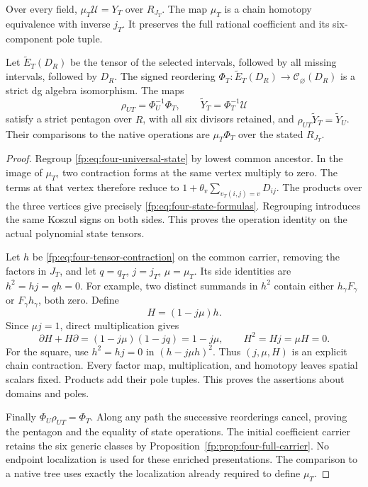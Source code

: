 \begin{theorem}
\label{fp:thm:four-common-state}
Over every field, \(\mu_T\mathcal U=Y_T\) over \(R_{J_T}\).
The map \(\mu_T\) is a chain homotopy equivalence with inverse
\(j_T\).  It preserves the full rational coefficient and its
six-component pole tuple.

Let \(\widetilde E_T(D_R)\) be the tensor of the selected
intervals, followed by all missing intervals, followed by \(D_R\).
The signed reordering
\(\Phi_T:\widetilde E_T(D_R)\to\mathcal C_\varnothing(D_R)\)
is a strict dg algebra isomorphism.  The maps
\[
 \rho_{UT}=\Phi_U^{-1}\Phi_T,\qquad
 \widetilde Y_T=\Phi_T^{-1}\mathcal U
\]
satisfy a strict pentagon over \(R\), with all six divisors retained,
and \(\rho_{UT}\widetilde Y_T=\widetilde Y_U\).
Their comparisons to the native operations are
\(\mu_T\Phi_T\) over the stated \(R_{J_T}\).
\end{theorem}

\begin{proof}
Regroup \eqref{fp:eq:four-universal-state} by lowest common ancestor.
In the image of \(\mu_T\), two contraction forms at the same
vertex multiply to zero.  The terms at that vertex therefore reduce to
\(1+\theta_v\sum_{v_T(i,j)=v}D_{ij}\).
The products over the three vertices give precisely
\eqref{fp:eq:four-state-formulas}.  Regrouping introduces the same
Koszul signs on both sides.  This proves the operation identity
on the actual polynomial state tensors.

Let \(h\) be \eqref{fp:eq:four-tensor-contraction} on the common
carrier, removing the factors in \(J_T\), and let \(q=q_T\),
\(j=j_T\), \(\mu=\mu_T\).  Its side identities are
\(h^2=hj=qh=0\).  For example, two distinct summands in
\(h^2\) contain either \(h_\gamma F_\gamma\) or
\(F_\gamma h_\gamma\), both zero.
Define
\begin{equation}\label{fp:eq:four-grouping-contraction}
 H=(1-j\mu)h.
\end{equation}
Since \(\mu j=1\), direct multiplication gives
\[
 \partial H+H\partial=(1-j\mu)(1-jq)=1-j\mu,
 \qquad H^2=Hj=\mu H=0.
\]
For the square, use \(h^2=hj=0\) in
\((h-j\mu h)^2\).  Thus \((j,\mu,H)\) is an explicit
chain contraction.  Every factor map, multiplication, and homotopy
leaves spatial scalars fixed.  Products add their pole tuples.
This proves the assertions about domains and poles.

Finally \(\Phi_U\rho_{UT}=\Phi_T\).  Along any path the
successive reorderings cancel, proving the pentagon and the equality
of state operations.  The initial coefficient carrier retains the
six generic classes by Proposition~\ref{fp:prop:four-full-carrier}.
No endpoint localization is used for these enriched presentations.
The comparison to a native tree uses exactly the localization already
required to define \(\mu_T\).
\end{proof}

